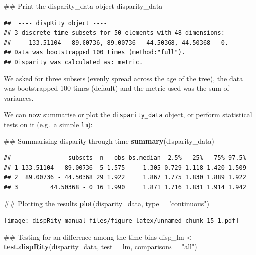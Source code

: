 \documentclass[]{book}
\newenvironment{Shaded}{\begin{snugshade}}{\end{snugshade}}
\newcommand{\KeywordTok}[1]{\textcolor[rgb]{0.13,0.29,0.53}{\textbf{#1}}}
\newcommand{\DataTypeTok}[1]{\textcolor[rgb]{0.13,0.29,0.53}{#1}}
\newcommand{\StringTok}[1]{\textcolor[rgb]{0.31,0.60,0.02}{#1}}
\newcommand{\NormalTok}[1]{#1}
\theoremstyle{definition}
\theoremstyle{definition}
\theoremstyle{definition}
\theoremstyle{remark}
\begin{document}
\begin{Shaded}
\begin{Highlighting}[]
\NormalTok{## Print the disparity_data object}
\NormalTok{disparity_data}
\end{Highlighting}
\end{Shaded}

\begin{verbatim}
##  ---- dispRity object ---- 
## 3 discrete time subsets for 50 elements with 48 dimensions:
##     133.51104 - 89.00736, 89.00736 - 44.50368, 44.50368 - 0.
## Data was bootstrapped 100 times (method:"full").
## Disparity was calculated as: metric.
\end{verbatim}

We asked for three subsets (evenly spread across the age of the tree),
the data was bootstrapped 100 times (default) and the metric used was
the sum of variances.

We can now summarise or plot the \texttt{disparity\_data} object, or
perform statistical tests on it (e.g.~a simple \texttt{lm}):

\begin{Shaded}
\begin{Highlighting}[]
\NormalTok{## Summarising disparity through time}
\KeywordTok{summary}\NormalTok{(disparity_data)}
\end{Highlighting}
\end{Shaded}

\begin{verbatim}
##                subsets  n   obs bs.median  2.5%   25%   75% 97.5%
## 1 133.51104 - 89.00736  5 1.575     1.305 0.729 1.118 1.420 1.509
## 2  89.00736 - 44.50368 29 1.922     1.867 1.775 1.830 1.889 1.922
## 3         44.50368 - 0 16 1.990     1.871 1.716 1.831 1.914 1.942
\end{verbatim}

\begin{Shaded}
\begin{Highlighting}[]
\NormalTok{## Plotting the results}
\KeywordTok{plot}\NormalTok{(disparity_data, }\DataTypeTok{type =} \StringTok{"continuous"}\NormalTok{)}
\end{Highlighting}
\end{Shaded}

\texttt{[image: dispRity\_manual\_files/figure-latex/unnamed-chunk-15-1.pdf]}

\begin{Shaded}
\begin{Highlighting}[]
\NormalTok{## Testing for an difference among the time bins}
\NormalTok{disp_lm <-}\StringTok{ }\KeywordTok{test.dispRity}\NormalTok{(disparity_data, }\DataTypeTok{test =}\NormalTok{ lm, }\DataTypeTok{comparisons =} \StringTok{"all"}\NormalTok{)}
\end{Highlighting}
\end{Shaded}
\end{document}
